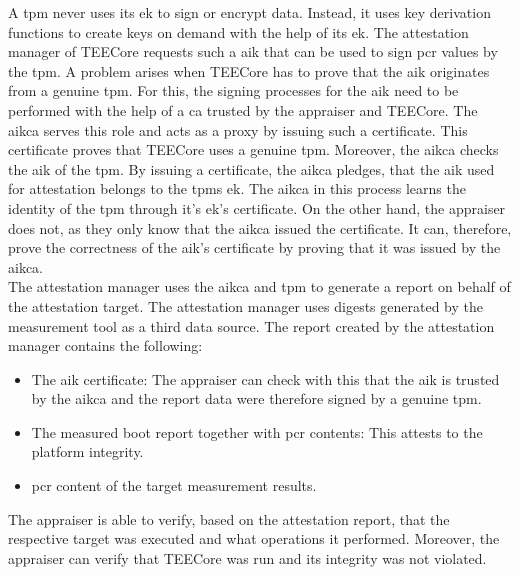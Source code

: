 A \gls{tpm} never uses its \gls{ek} to sign or encrypt data. Instead, it uses
key derivation functions to create keys on demand with the help of its
\gls{ek}. The attestation manager of TEECore requests such a \gls{aik} that
can be used to sign \gls{pcr} values by the \gls{tpm}. A problem arises when
TEECore has to prove that the \gls{aik} originates from a genuine \gls{tpm}. For
this, the signing processes for the \gls{aik} need to be performed with the help
of a \gls{ca} trusted by the appraiser and TEECore. The \gls{aikca} serves this
role and acts as a proxy by issuing such a certificate. This certificate proves
that TEECore uses a genuine \gls{tpm}. Moreover, the \gls{aikca} checks the
\gls{aik} of the \gls{tpm}. By issuing a certificate, the \gls{aikca} pledges,
that the \gls{aik} used for attestation belongs to the \gls{tpm}s \gls{ek}.
The \gls{aikca} in this process learns the identity of the \gls{tpm} through
it's \gls{ek}'s certificate. On the other hand, the appraiser does not, as they
only know that the \gls{aikca} issued the certificate. It can, therefore, prove
the correctness of the \gls{aik}'s certificate by proving that it was issued by
the \gls{aikca}.\\

The attestation manager uses the \gls{aikca} and \gls{tpm} to generate a report
on behalf of the attestation target. The attestation manager uses digests
generated by the measurement tool as a third data source. The report created by
the attestation manager contains the following:
\begin{itemize}
  \item The \gls{aik} certificate: The appraiser can check with this that the
    \gls{aik} is trusted by the \gls{aikca} and the report data were
    therefore signed by a genuine \gls{tpm}.
  \item The measured boot report together with \gls{pcr} contents: This attests
    to the platform integrity.
  \item \gls{pcr} content of the target measurement results.
\end{itemize}

The appraiser is able to verify, based on the attestation report, that the
respective target was executed and what operations it performed. Moreover, the
appraiser can verify that TEECore was run and its integrity was not
violated.

